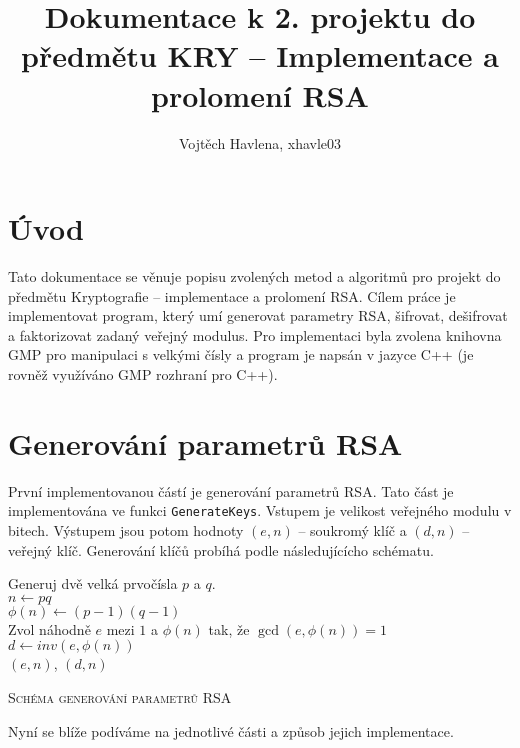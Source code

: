 \documentclass[a4paper,12pt]{article}
\title{Dokumentace k 2. projektu do předmětu KRY -- Implementace a prolomení RSA}
\author{Vojtěch Havlena, xhavle03}
\begin{document}
\maketitle

\section{Úvod}
Tato dokumentace se věnuje popisu zvolených metod a algoritmů pro projekt 
do předmětu Kryptografie -- implementace a prolomení RSA. Cílem práce
je implementovat program, který umí generovat parametry RSA, šifrovat,
dešifrovat a faktorizovat zadaný veřejný modulus. Pro implementaci byla zvolena
knihovna GMP pro manipulaci s velkými čísly a program je napsán v jazyce C++ (je rovněž využíváno
GMP rozhraní pro C++).

\section{Generování parametrů RSA}
První implementovanou částí je generování parametrů RSA. Tato část je implementována 
ve funkci \texttt{GenerateKeys}. Vstupem je 
velikost veřejného modulu v bitech. Výstupem jsou potom hodnoty $(e,n)$ -- soukromý klíč
a $(d,n)$ -- veřejný klíč. Generování klíčů probíhá podle následujícícho schématu.

\medskip
\begin{algorithm}[H]
 \SetNlSty{}{}{:}
 \SetNlSkip{-1.2em}
 \SetInd{1em}{1em}
 \BlankLine
 \Indentp{1.7em}
    Generuj dvě velká prvočísla $p$ a $q$. \\
    $n \gets pq$ \\
    $\phi(n) \gets (p-1)(q-1)$ \\
    Zvol náhodně $e$ mezi $1$ a $\phi(n)$ tak, že $\gcd(e, \phi(n)) = 1$ \\
    $d \gets inv(e, \phi(n))$\\
    \Return $(e,n)$, $(d,n)$
 \caption{\textsc{Schéma generování parametrů RSA}}
 \label{fastSlam}
\end{algorithm}

\medskip
Nyní se blíže podíváme na jednotlivé části a způsob jejich implementace.
\end{document}
